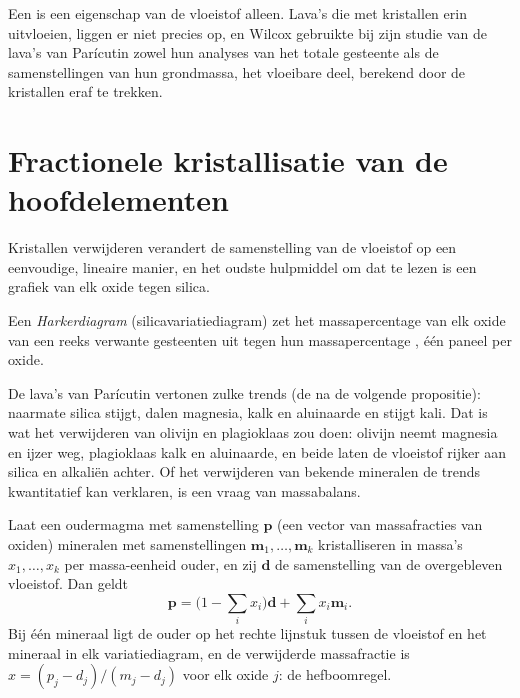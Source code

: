 Een  is een eigenschap van de vloeistof alleen. Lava's die met
kristallen erin uitvloeien, liggen er niet precies op, en Wilcox gebruikte bij zijn studie van de lava's van
Parícutin zowel hun analyses van het totale gesteente als de samenstellingen van hun
grondmassa, het vloeibare deel, berekend door de kristallen eraf te trekken.

\section{Fractionele kristallisatie van de hoofdelementen}\label{sec:b2:magmatic-differentiation:majors}

Kristallen verwijderen verandert de samenstelling van de vloeistof op een eenvoudige, lineaire manier,
en het oudste hulpmiddel om dat te lezen is een grafiek van elk oxide tegen silica.

\begin{definition}[Harkerdiagram]\label{def:b2:magmatic-differentiation:harker}
Een \emph{Harkerdiagram} (silicavariatiediagram) zet het
massapercentage van elk oxide van een reeks verwante gesteenten uit tegen hun
massapercentage , één paneel per oxide.
\end{definition}


De lava's van Parícutin vertonen zulke trends (de  na de volgende
propositie): naarmate silica stijgt, dalen magnesia, kalk en aluinaarde en stijgt kali. Dat is
wat het verwijderen van olivijn en plagioklaas zou doen:
olivijn neemt magnesia en ijzer weg, plagioklaas kalk en aluinaarde, en beide laten
de vloeistof rijker aan silica en alkaliën achter. Of het verwijderen van bekende mineralen de
trends kwantitatief kan verklaren, is een vraag van massabalans.

\begin{proposition}\label{prop:b2:magmatic-differentiation:lever}
Laat een oudermagma met samenstelling $\mathbf p$ (een vector van massafracties van oxiden)
mineralen met samenstellingen $\mathbf m_1, \dots, \mathbf m_k$ kristalliseren in massa's
$x_1, \dots, x_k$ per massa-eenheid ouder, en zij $\mathbf d$ de samenstelling
van de overgebleven vloeistof. Dan geldt
\[
\mathbf p = \Big(1 - \sum_i x_i\Big)\mathbf d + \sum_i x_i \mathbf m_i .
\]
Bij één mineraal ligt de ouder op het rechte lijnstuk tussen de vloeistof en het
mineraal in elk variatiediagram, en de verwijderde massafractie is
$x = (p_j - d_j)/(m_j - d_j)$ voor elk oxide $j$: de hefboomregel.
\end{proposition}

